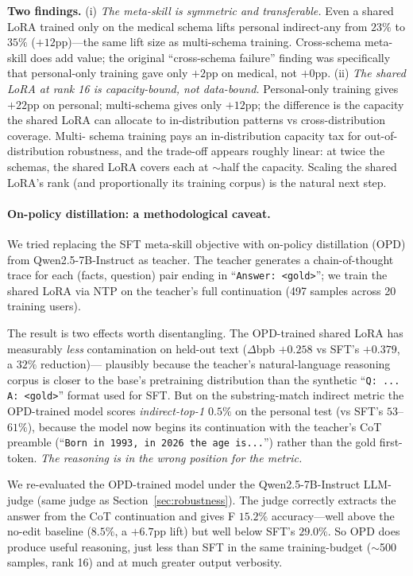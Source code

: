 \documentclass{article}
\begin{document}
\textbf{Two findings.} (i) \emph{The meta-skill is symmetric and
transferable.} Even a shared LoRA trained only on the medical
schema lifts personal indirect-any from $23\%$ to $35\%$
($+12$pp)—the same lift size as multi-schema training. Cross-schema
meta-skill does add value; the original ``cross-schema failure''
finding was specifically that personal-only training gave only
$+2$pp on medical, not $+0$pp. (ii) \emph{The shared LoRA at rank
16 is capacity-bound, not data-bound.} Personal-only training
gives $+22$pp on personal; multi-schema gives only $+12$pp; the
difference is the capacity the shared LoRA can allocate to
in-distribution patterns vs cross-distribution coverage. Multi-
schema training pays an in-distribution capacity tax for
out-of-distribution robustness, and the trade-off appears
roughly linear: at twice the schemas, the shared LoRA covers
each at $\sim$half the capacity. Scaling the shared LoRA's rank
(and proportionally its training corpus) is the natural next step.

\paragraph{On-policy distillation: a methodological caveat.}
We tried replacing the SFT meta-skill objective with on-policy
distillation (OPD) from Qwen2.5-7B-Instruct as teacher. The teacher
generates a chain-of-thought trace for each (facts, question) pair
ending in ``\texttt{Answer: <gold>}''; we train the shared LoRA via
NTP on the teacher's full continuation (497 samples across 20
training users).

The result is two effects worth disentangling. The OPD-trained
shared LoRA has measurably \emph{less} contamination on held-out
text ($\Delta$bpb $+0.258$ vs SFT's $+0.379$, a $32\%$ reduction)—
plausibly because the teacher's natural-language reasoning corpus
is closer to the base's pretraining distribution than the synthetic
``\texttt{Q: ... A: <gold>}'' format used for SFT. But on the
substring-match indirect metric the OPD-trained model scores
\emph{indirect-top-1 $0.5\%$} on the personal test (vs SFT's
$53$--$61\%$), because the model now begins its continuation with
the teacher's CoT preamble (``\texttt{Born in 1993, in 2026 the
age is...}'') rather than the gold first-token. \emph{The reasoning
is in the wrong position for the metric.}

We re-evaluated the OPD-trained model under the Qwen2.5-7B-Instruct
LLM-judge (same judge as Section~\ref{sec:robustness}). The judge
correctly extracts the answer from the CoT continuation and gives F
$15.2\%$ accuracy—well above the no-edit baseline ($8.5\%$, a
$+6.7$pp lift) but well below SFT's $29.0\%$. So OPD does produce
useful reasoning, just less than SFT in the same training-budget
($\sim$500 samples, rank 16) and at much greater output verbosity.
\end{document}
